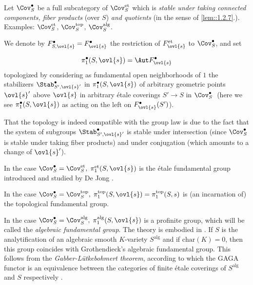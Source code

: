 \begin{para}\label{para::1.4.1} Let $\Cov^\bullet_S$ be a full
 subcategory of $\Cov^{\mathrm{et}}_S$ which is {\it stable under taking
 connected components, fiber products} (over $S$) {\it and quotients}
 (in the sense of \ref{lem::1.2.7}.). Examples:  $\Cov^{\mathrm{et}}_S$,
 $\Cov^{\mathrm{top}}_S$, $\Cov^{\mathrm{alg}}_S$.

 We denote by $F^\bullet_{S,\ovl{s}}=F^\bullet_{\ovl{s}}$ the
 restriction of $F^{\mathrm{et}}_{\ovl{s}}$ to $\Cov^\bullet_S$, and set 

 \begin{equation*}
  \pi_1^{\bullet}(S,\ovl{s}) = \Aut F^\bullet_{\ovl{s}}
 \end{equation*}
 topologized by considering as fundamental
 open neighborhoods of $1$ the stabilizers $\Stab^\bullet_{S',\ovl{s}'}$
 in $\pi_1^{\bullet}(S,\ovl{s})$ of arbitrary geometric points $\ovl{s}'$
 above $\ovl{s}$ in arbitrary \'etale coverings $S'\to S$ in
 $\Cov^\bullet_S\;$ (here we see $\pi_1^{\bullet}(S,\ovl{s})$ as acting
 on the left on   $F^\bullet_{\ovl{s}}(S')$).

 That the topology is indeed compatible with the group law is due to
 the fact that the system of subgroups $\Stab^\bullet_{S',\ovl{s}'}$ is
 stable under intersection (since $\Cov^\bullet_S$ is stable under
 taking fiber products) and under conjugation (which amounts to a change
 of $\ovl{s}'$).

 \medskip In the case $\Cov^\bullet_S = \Cov^{\mathrm{et}}_S,\;
 \pi_1^{\mathrm{et}}(S,\ovl{s})$ is the \'etale fundamental group
 introduced and studied by De Jong \cite{efgonas}.

 In the case $\Cov^\bullet_S = \Cov^{\mathrm{top}}_S,\;
 \pi_1^{\mathrm{top}}(S,\ovl{s})=\pi_1^{\mathrm{top}}(S, s)$ is (an
 incarnation of) the topological fundamental group.

 In the case $\Cov^\bullet_S = \Cov^{\mathrm{alg}}_S,\;
 \pi_1^{\mathrm{alg}}(S,\ovl{s})$ is a profinite group, which will be
 called the {\it algebraic fundamental group}. The theory is embodied in
 \cite[V]{sga1}.
 If $S$ is the analytification of an algebraic smooth
 $K$-variety $S^{\mathrm{alg}}$ and if $\mathrm{char}(K)=0$, then this
 group coincides with Grothendieck's algebraic fundamental 
 group. This follows from the {\it Gabber-L\"utkebohmert theorem},
 according to which the GAGA functor is an equivalence between the
 categories of finite \'etale coverings of $S^{\mathrm{alg}}$ and $S$
 respectively \cite{repfapf}.
\end{para}

